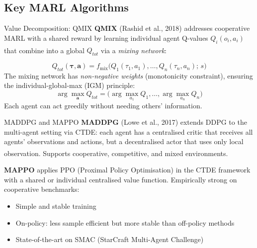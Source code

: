 \subsection{Key MARL Algorithms}

\begin{v3topic}{Value Decomposition: QMIX}
    \textbf{QMIX} (Rashid et al., 2018) addresses cooperative MARL with a shared
    reward by learning individual agent Q-values $Q_i(o_i, a_i)$ that combine
    into a global $Q_{tot}$ via a \emph{mixing
    network}:\textsuperscript{\cite[][p.~452]{weissMultiagentSystems2013}}

    \begin{equation}
        Q_{tot}(\boldsymbol{\tau}, \mathbf{a}) = f_{\text{mix}}\bigl(Q_1(\tau_1, a_1), \ldots, Q_n(\tau_n, a_n);\, s\bigr)
    \end{equation}
    The mixing network has \emph{non-negative weights} (monotonicity constraint),
    ensuring the individual-global-max (IGM) principle:
    \[
        \arg\max_{\mathbf{a}} Q_{tot} = \bigl(\arg\max_{a_1} Q_1, \ldots, \arg\max_{a_n} Q_n\bigr)
    \]
    Each agent can act greedily without needing others' information.

\end{v3topic}
\begin{v3topic}{MADDPG and MAPPO}
    \textbf{MADDPG} (Lowe et al., 2017) extends DDPG to the multi-agent setting
    via CTDE: each agent has a centralised critic that receives all agents'
    observations and actions, but a decentralised actor that uses only local
    observation.\textsuperscript{\cite[][p.~455]{weissMultiagentSystems2013}}
    Supports cooperative, competitive, and mixed environments.

    \textbf{MAPPO} applies PPO (Proximal Policy Optimisation) in the CTDE
    framework with a shared or individual centralised value function.
    Empirically strong on cooperative benchmarks:
    \begin{itemize}
        \item Simple and stable training
        \item On-policy: less sample efficient but more stable than off-policy methods
        \item State-of-the-art on SMAC (StarCraft Multi-Agent Challenge)
    \end{itemize}

\end{v3topic}
